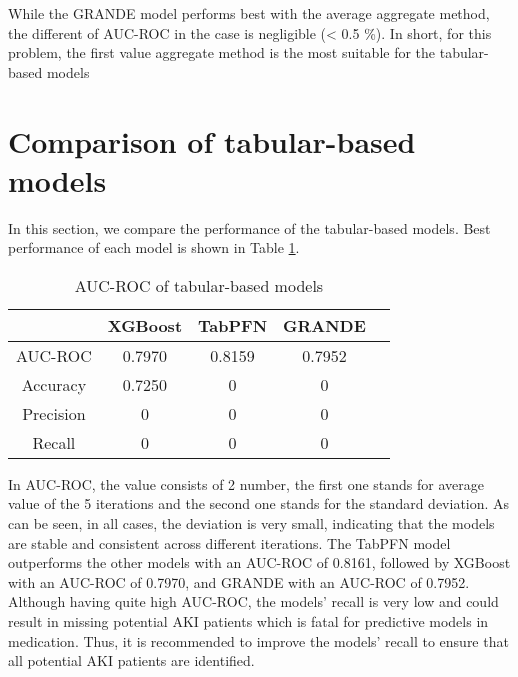\documentclass[../main.tex]{subfiles}
\begin{document}
While the GRANDE model performs best with the average aggregate method, the different of AUC-ROC in the case is negligible (< 0.5 \%).
In short, for this problem, the first value aggregate method is the most suitable for the tabular-based models





\section{Comparison of tabular-based models}

In this section, we compare the performance of the tabular-based models. 
Best performance of each model is shown in Table \ref{tab:tabular_models}.

\begin{table}[H]
    \centering
    \caption{AUC-ROC of tabular-based models}
    \label{tab:tabular_models}
    \begin{tabular}{|c|c|c|c|c|}
        \hline
        \textbf{} & 
        \textbf{XGBoost} & 
        \textbf{TabPFN} & 
        \textbf{GRANDE} \\
        \hline

        AUC-ROC & 
        0.7970 & 
        0.8159 & 
        0.7952 \\

        Accuracy &
        0.7250 &
        0 &
        0 \\

        Precision &
        0 &
        0 &
        0 \\

        Recall &
        0 &
        0 &
        0 \\

        \hline
    \end{tabular}
\end{table}

In AUC-ROC, the value consists of 2 number, the first one stands for average value of the 5 iterations and the second one stands for the standard deviation.
As can be seen, in all cases, the deviation is very small, indicating that the models are stable and consistent across different iterations.
The TabPFN model outperforms the other models with an AUC-ROC of 0.8161, followed by XGBoost with an AUC-ROC of 0.7970, and GRANDE with an AUC-ROC of 0.7952.
Although having quite high AUC-ROC, the models' recall is very low and could result in missing potential AKI patients which is fatal for predictive models in medication. 
Thus, it is recommended to improve the models' recall to ensure that all potential AKI patients are identified.
\end{document}
